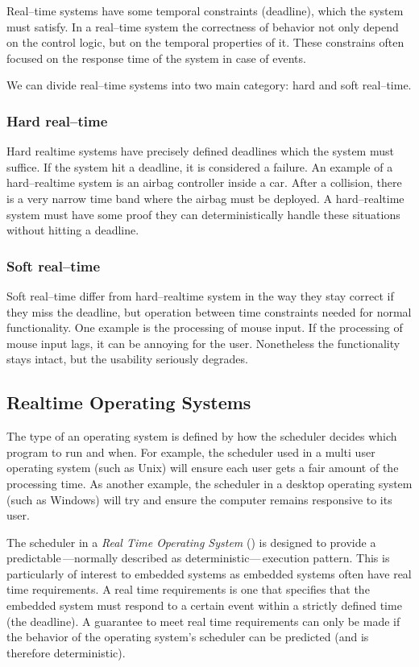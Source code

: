 Real--time systems have some temporal constraints (deadline), which the system must satisfy. In a real--time system the correctness of behavior not only depend on the control logic, but on the temporal properties of it. These constrains often focused on the response time of the system in case of events.

We can divide real--time systems into two main category: hard and soft real--time.

\subsubsection{Hard real--time}

Hard realtime systems have precisely defined deadlines which the system must suffice. If the system hit a deadline, it is considered a failure. An example of a hard--realtime system is an airbag controller inside a car. After a collision, there is a very narrow time band where the airbag must be deployed. A hard--realtime system must have some proof they can deterministically handle these situations without hitting a deadline.

\subsubsection{Soft real--time}

Soft real--time differ from hard--realtime system in the way they stay correct if they miss the deadline, but operation between time constraints needed for normal functionality. One example is the processing of mouse input. If the processing of mouse input lags, it can be annoying for the user. Nonetheless the functionality stays intact, but the usability seriously degrades.

\subsection{Realtime Operating Systems}

The type of an operating system is defined by how the scheduler decides which program to run and when. For example, the scheduler used in a multi user operating system (such as Unix) will ensure each user gets a fair amount of the processing time. As another example, the scheduler in a desktop operating system (such as Windows) will try and ensure the computer remains responsive to its user.

The scheduler in a \emph{Real Time Operating System} (\rtos) is designed to provide a predictable\,---normally described as deterministic---\,execution pattern. This is particularly of interest to embedded systems as embedded systems often have real time requirements. A real time requirements is one that specifies that the embedded system must respond to a certain event within a strictly defined time (the deadline). A guarantee to meet real time requirements can only be made if the behavior of the operating system's scheduler can be predicted (and is therefore deterministic).\citep{RTOS}

